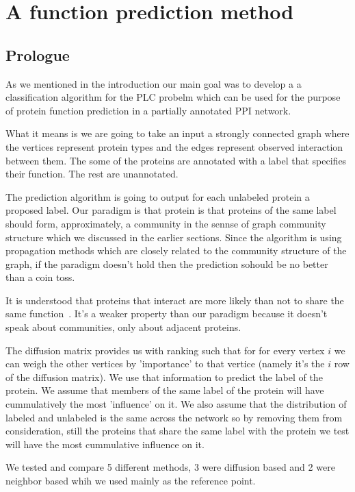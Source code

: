 
\section{A function prediction method}
\subsection*{Prologue}
As we mentioned in the introduction our main goal was to develop a
a classification algorithm for the PLC probelm which can be used for the
purpose of protein function prediction in a partially annotated PPI
network.

What it means is we are going to take an input a strongly connected
graph where the vertices represent protein types and the edges represent
observed interaction between them. The some of the proteins are
annotated with a label that specifies their function. The rest are
unannotated.

The prediction algorithm is going to output for each unlabeled protein a
proposed label. Our paradigm is that protein is that proteins of the
same label should form, approximately, a community in the sennse of
graph community structure which we discussed in the earlier sections.
Since the algorithm is using propagation methods which are closely
related to the community structure of the graph, if the paradigm doesn't
hold then the prediction sohould be no better than a coin toss.

It is understood that proteins that interact are more likely than not to
share the same function~\cite{schwikowski2000network}. It's a weaker
property than our paradigm because it doesn't speak about communities,
only about adjacent proteins.

The diffusion matrix provides us with ranking such that for for every
vertex $i$ we can weigh the other vertices by 'importance' to that
vertice (namely it's the $i$ row of the diffusion matrix). We use that
information to predict the label of the protein. We assume that members
of the same label of the protein will have cummulatively the most
'influence' on it. We also assume that the distribution of labeled and
unlabeled is the same across the network so by removing them from
consideration, still the proteins that share the same label with the
protein we test will have the most cummulative influence on it.

We tested and compare 5 different methods, 3 were diffusion based and 2
were neighbor based whih we used mainly as the reference point.


